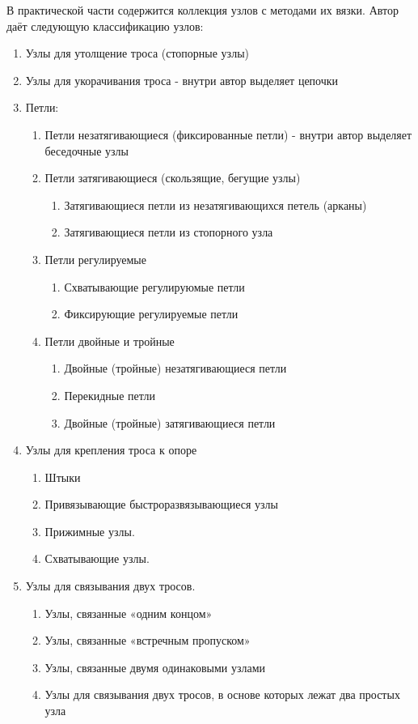 В практической части содержится коллекция узлов с методами их вязки.
Автор даёт следующую классификацию узлов:
\begin{enumerate}
  \item Узлы для утолщение троса (стопорные узлы)
  \item Узлы для укорачивания троса - внутри автор выделяет цепочки
  \item Петли:
  \begin{enumerate}
    \item Петли незатягивающиеся (фиксированные петли) - внутри автор выделяет беседочные узлы
    \item Петли затягивающиеся (скользящие, бегущие узлы)
    \begin{enumerate}
      \item Затягивающиеся петли из незатягивающихся петель (арканы)
      \item Затягивающиеся петли из стопорного узла
    \end{enumerate}
    \item Петли регулируемые
    \begin{enumerate}
      \item Схватывающие регулируюмые петли
      \item Фиксирующие регулируемые петли
    \end{enumerate}
    \item Петли двойные и тройные
    \begin{enumerate}
      \item Двойные (тройные) незатягивающиеся петли
      \item Перекидные петли
      \item Двойные (тройные) затягивающиеся петли
    \end{enumerate}
  \end{enumerate}
  \item Узлы для крепления троса к опоре
  \begin{enumerate}
    \item Штыки
    \item Привязывающие быстроразвязывающиеся узлы
    \item Прижимные узлы.
    \item Схватывающие узлы.
  \end{enumerate}
  \item Узлы для связывания двух тросов.
  \begin{enumerate}
    \item Узлы, связанные «одним концом»
    \item Узлы, связанные «встречным пропуском»
    \item Узлы, связанные двумя одинаковыми узлами
    \item Узлы для связывания двух тросов, в основе которых лежат два простых узла
  \end{enumerate}
\end{enumerate}